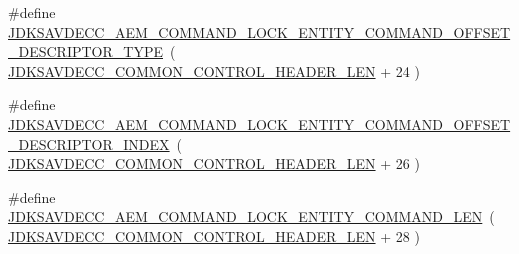 \begin{DoxyCompactItemize}
\item 
\#define \hyperlink{group__command__lock__entity_ga6f928332cad3c37d4fa173ec3f958e1d}{J\+D\+K\+S\+A\+V\+D\+E\+C\+C\+\_\+\+A\+E\+M\+\_\+\+C\+O\+M\+M\+A\+N\+D\+\_\+\+L\+O\+C\+K\+\_\+\+E\+N\+T\+I\+T\+Y\+\_\+\+C\+O\+M\+M\+A\+N\+D\+\_\+\+O\+F\+F\+S\+E\+T\+\_\+\+D\+E\+S\+C\+R\+I\+P\+T\+O\+R\+\_\+\+T\+Y\+PE}~( \hyperlink{group__jdksavdecc__avtp__common__control__header_gaae84052886fb1bb42f3bc5f85b741dff}{J\+D\+K\+S\+A\+V\+D\+E\+C\+C\+\_\+\+C\+O\+M\+M\+O\+N\+\_\+\+C\+O\+N\+T\+R\+O\+L\+\_\+\+H\+E\+A\+D\+E\+R\+\_\+\+L\+EN} + 24 )
\item 
\#define \hyperlink{group__command__lock__entity_ga0a01b61538249f5de7678dc89e9667b4}{J\+D\+K\+S\+A\+V\+D\+E\+C\+C\+\_\+\+A\+E\+M\+\_\+\+C\+O\+M\+M\+A\+N\+D\+\_\+\+L\+O\+C\+K\+\_\+\+E\+N\+T\+I\+T\+Y\+\_\+\+C\+O\+M\+M\+A\+N\+D\+\_\+\+O\+F\+F\+S\+E\+T\+\_\+\+D\+E\+S\+C\+R\+I\+P\+T\+O\+R\+\_\+\+I\+N\+D\+EX}~( \hyperlink{group__jdksavdecc__avtp__common__control__header_gaae84052886fb1bb42f3bc5f85b741dff}{J\+D\+K\+S\+A\+V\+D\+E\+C\+C\+\_\+\+C\+O\+M\+M\+O\+N\+\_\+\+C\+O\+N\+T\+R\+O\+L\+\_\+\+H\+E\+A\+D\+E\+R\+\_\+\+L\+EN} + 26 )
\item 
\#define \hyperlink{group__command__lock__entity_gaae9fdce1f4e3de3d6a0829b4b077b418}{J\+D\+K\+S\+A\+V\+D\+E\+C\+C\+\_\+\+A\+E\+M\+\_\+\+C\+O\+M\+M\+A\+N\+D\+\_\+\+L\+O\+C\+K\+\_\+\+E\+N\+T\+I\+T\+Y\+\_\+\+C\+O\+M\+M\+A\+N\+D\+\_\+\+L\+EN}~( \hyperlink{group__jdksavdecc__avtp__common__control__header_gaae84052886fb1bb42f3bc5f85b741dff}{J\+D\+K\+S\+A\+V\+D\+E\+C\+C\+\_\+\+C\+O\+M\+M\+O\+N\+\_\+\+C\+O\+N\+T\+R\+O\+L\+\_\+\+H\+E\+A\+D\+E\+R\+\_\+\+L\+EN} + 28 )
\end{DoxyCompactItemize}
